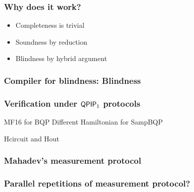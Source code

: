 \documentclass{beamer}
\begin{document}
\begin{frame}
	\frametitle{Why does it work?}
	\begin{itemize}[<+->]
		\item Completeness is trivial
		\item Soundness by reduction
		\item Blindness by hybrid argument
	\end{itemize}
\end{frame}

\begin{frame}
	\frametitle{Compiler for blindness: Blindness}

\end{frame}

\begin{frame}
	\frametitle{Verification under $\operatorname{\mathsf{QPIP}}_1$ protocols}
	MF16 for BQP
	Different Hamiltonian for SampBQP

	Hcircuit and Hout
\end{frame}

\begin{frame}
	\frametitle{Mahadev's measurement protocol}

\end{frame}

\begin{frame}
	\frametitle{Parallel repetitions of measurement protocol?}

\end{frame}
\end{document}
